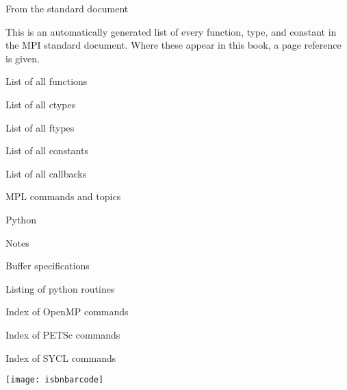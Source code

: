\documentclass[11pt,letterpaper,twoside,openany]{boek3}
\begin{document}
 {From the standard document}

This is an automatically generated list of every
function, type, and constant in the MPI standard document.
Where these appear in this book, a page reference is given.

 {List of all functions}

 {List of all ctypes}

 {List of all ftypes}

 {List of all constants}

 {List of all callbacks}


 {MPL commands and topics}
\label{sec:idx:mpl}

\begin{multicols*}{2}
  \printindex[mpl]
\end{multicols*}

 {Python}

 {Notes}

\begin{multicols*}{2}
  \printindex[python]
\end{multicols*}

 {Buffer specifications}

{\small
  
  
  
  
}

 {Listing of python routines}

\begin{multicols}{3}
\small
{}




\end{multicols}

 {Index of OpenMP commands}

\begin{multicols*}{2}
\printindex[omp]
\end{multicols*}

 {Index of PETSc commands}

\begin{multicols*}{2}
\printindex[petsc]
\end{multicols*}

 {Index of SYCL commands}

\begin{multicols*}{2}
\printindex[sycl]
\end{multicols*}

\hbox{}\vfill
\texttt{[image: isbnbarcode]}

\closeout\chapterlist
\end{document}
